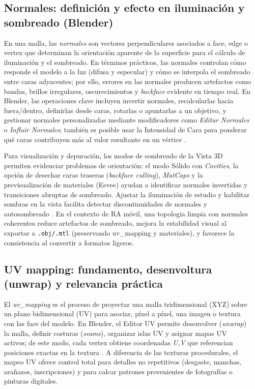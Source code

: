 \subsection*{Normales: definición y efecto en iluminación y sombreado (Blender)}

En una \gls{malla}, las \textit{\gls{normales}} son vectores perpendiculares asociados a \gls{face}, \gls{edge} o \gls{vertex} que determinan la orientación aparente de la superficie para el cálculo de iluminación y el sombreado. En términos prácticos, las \gls{normales} controlan cómo responde el modelo a la luz (difusa y especular) y cómo se interpola el sombreado entre caras adyacentes; por ello, errores en las \gls{normales} producen artefactos como bandas, brillos irregulares, oscurecimientos y \textit{backface} evidente en tiempo real. En Blender, las operaciones clave incluyen invertir \gls{normales}, recalcularlas hacia fuera/dentro, definirlas desde caras, rotarlas o apuntarlas a un objetivo, y gestionar \gls{normales} personalizadas mediante modificadores como \textit{Editar Normales} o \textit{Influir Normales}; también es posible usar la Intensidad de Cara para ponderar qué caras contribuyen más al valor resultante en un vértice \cite{BlenderManual293Normals}.

Para visualización y depuración, los modos de sombreado de la Vista 3D permiten evidenciar problemas de orientación: el modo Sólido con \textit{Cavities}, la opción de desechar caras traseras (\textit{backface culling}), \textit{MatCaps} y la previsualización de materiales (Eevee) ayudan a identificar \gls{normales} invertidas y transiciones abruptas de sombreado. Ajustar la iluminación de estudio y habilitar sombras en la vista facilita detectar discontinuidades de \gls{normales} y autosombreado \cite{BlenderManual34Shading}. En el contexto de RA móvil, una \gls{topologia} limpia con \gls{normales} coherentes reduce artefactos de sombreado, mejora la estabilidad visual al exportar a \texttt{.obj/.mtl} (preservando \gls{uv_mapping} y materiales), y favorece la consistencia al convertir a formatos ligeros.

\subsection*{UV mapping: fundamento, desenvoltura (unwrap) y relevancia práctica}

El \textit{\gls{uv_mapping}} es el proceso de proyectar una \gls{malla} tridimensional (XYZ) sobre un plano bidimensional (UV) para asociar, píxel a píxel, una imagen o textura con las \gls{face} del modelo. En Blender, el Editor UV permite desenvolver (\textit{unwrap}) la \gls{malla}, definir costuras (\textit{seams}), organizar islas UV y asignar mapas UV activos; de este modo, cada \gls{vertex} obtiene coordenadas \textit{U,V} que referencian posiciones exactas en la textura \cite{BlenderManual291UV}. A diferencia de las texturas procedurales, el mapeo UV ofrece control total para detalles no repetitivos (desgaste, manchas, arañazos, inscripciones) y para calcar patrones provenientes de fotografías o pinturas digitales.

